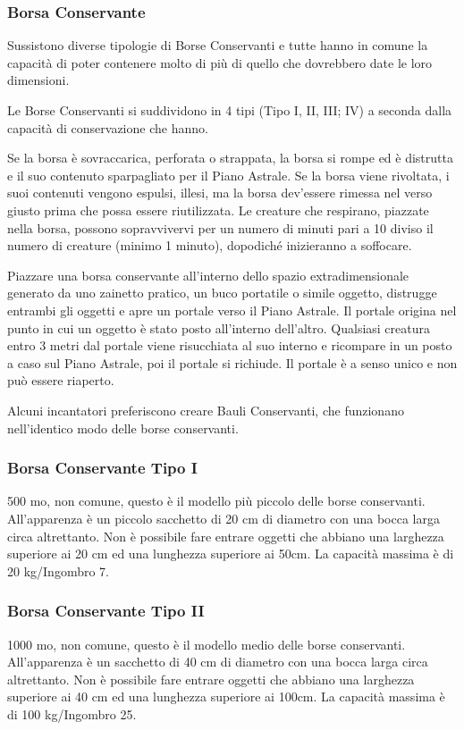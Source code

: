\begin{multicols}{2}
	\subsubsection*{Borsa Conservante}

	Sussistono diverse tipologie di Borse Conservanti e tutte hanno in comune la capacità di poter contenere molto di più di quello che dovrebbero date le loro dimensioni.

	Le Borse Conservanti si suddividono in 4 tipi (Tipo I, II, III; IV) a seconda dalla capacità di conservazione che hanno.

	Se la borsa è sovraccarica, perforata o strappata, la borsa si rompe ed è distrutta e il suo contenuto sparpagliato per il Piano Astrale. Se la borsa viene rivoltata, i suoi contenuti vengono espulsi, illesi, ma la borsa dev'essere rimessa nel verso giusto prima che possa essere riutilizzata. Le creature che respirano, piazzate nella borsa, possono sopravvivervi per un numero di minuti pari a 10 diviso il numero di creature (minimo 1 minuto), dopodiché inizieranno a soffocare.

	Piazzare una borsa conservante all'interno dello spazio extradimensionale generato da uno zainetto pratico, un buco portatile o simile oggetto, distrugge entrambi gli oggetti e apre un portale verso il Piano Astrale. Il portale origina nel punto in cui un oggetto è stato posto all'interno dell'altro. Qualsiasi creatura entro 3 metri dal portale viene risucchiata al suo interno e ricompare in un posto a caso sul Piano Astrale, poi il portale si richiude. Il portale è a senso unico e non può essere riaperto.


	Alcuni incantatori preferiscono creare Bauli Conservanti, che funzionano nell'identico modo delle borse conservanti.

	\subsubsection*{Borsa Conservante Tipo I}
	500 mo, non comune, questo è il modello più piccolo delle borse conservanti. All'apparenza è un piccolo sacchetto di 20 cm di diametro con una bocca larga circa altrettanto.
	Non è possibile fare entrare oggetti che abbiano una larghezza superiore ai 20 cm ed una lunghezza superiore ai 50cm.
	La capacità massima è di 20 kg/Ingombro 7.

	\subsubsection*{Borsa Conservante Tipo II}
	1000 mo, non comune, questo è il modello medio delle borse conservanti. All'apparenza è un sacchetto di 40 cm di diametro con una bocca larga circa altrettanto.
	Non è possibile fare entrare oggetti che abbiano una larghezza superiore ai 40 cm ed una lunghezza superiore ai 100cm.
	La capacità massima è di 100 kg/Ingombro 25.


\end{multicols}
